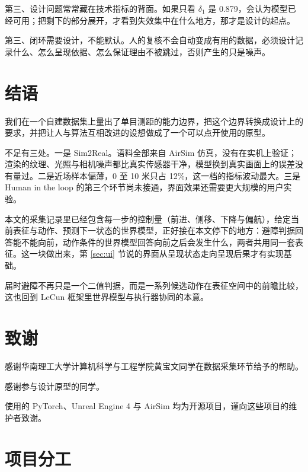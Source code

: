 \documentclass[12pt,a4paper]{ctexart}
\begin{document}
第三、设计问题常常藏在技术指标的背面。如果只看 $\delta_1$ 是 0.879，会认为模型已经可用；把剩下的部分展开，才看到失效集中在什么地方，那才是设计的起点。

第三、闭环需要设计，不能默认。人的复核不会自动变成有用的数据，必须设计记录什么、怎么呈现依据、怎么保证理由不被跳过，否则产生的只是噪声。

\section{结语}

我们在一个自建数据集上量出了单目测距的能力边界，把这个边界转换成设计上的要求，并把让人与算法互相改进的设想做成了一个可以点开使用的原型。

不足有三处。一是 Sim2Real。语料全部来自 AirSim 仿真，没有在实机上验证；渲染的纹理、光照与相机噪声都比真实传感器干净，模型换到真实画面上的误差没有量过。二是近场样本偏薄，0 至 10 米只占 12\%，这一档的指标波动最大。三是 Human in the loop 的第三个环节尚未接通，界面效果还需要更大规模的用户实验。

本文的采集记录里已经包含每一步的控制量（前进、侧移、下降与偏航），给定当前表征与动作、预测下一状态的世界模型，正好接在本文停下的地方：避障判据回答能不能向前，动作条件的世界模型回答向前之后会发生什么，两者共用同一套表征。这一块做出来，第 \ref{sec:ui} 节说的界面从呈现状态走向呈现后果才有实现基础。

届时避障不再只是一个二值判据，而是一系列候选动作在表征空间中的前瞻比较，这也回到 LeCun 框架里世界模型与执行器协同的本意\cite{lecun}。

\section*{致谢}

感谢华南理工大学计算机科学与工程学院黄宝文同学在数据采集环节给予的帮助。

感谢参与设计原型的同学。

使用的 PyTorch、Unreal Engine 4 与 AirSim 均为开源项目，谨向这些项目的维护者致谢。

\section*{项目分工}
\end{document}
